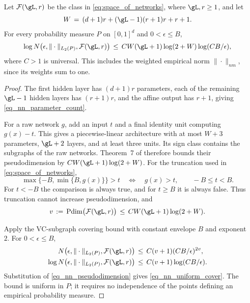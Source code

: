 \documentclass[twoside,11pt]{article}
\newenvironment{revision}{\color{revisionred}}{}
\begin{document}
\begin{revision}
\begin{lemma}
\label{nn_covering}
Let \(\mathcal F(\gL,r)\) be the class in
\eqref{eq:space_of_networks}, where \(\gL,r\geq1\), and let
\begin{equation}
\label{eq_nn_parameter_count}
W \,=\, (d+1)r+(\gL-1)(r+1)r+r+1.
\end{equation}
For every probability measure \(P\) on \([0,1]^d\) and
\(0<\epsilon\leq B\),
\begin{equation}
\label{eq_nn_uniform_cover}
\log N\bigl(\epsilon,\|\cdot\|_{L_2(P)},\mathcal F(\gL,r)\bigr)
\,\leq\,
C W(\gL+1)\log(2+W)\log(CB/\epsilon),
\end{equation}
where \(C>1\) is universal. This includes the weighted empirical
norm \(\|\cdot\|_{nm}\), since its weights sum to one.
\end{lemma}
\begin{proof}
The first hidden layer has \((d+1)r\) parameters, each of the
remaining \(\gL-1\) hidden layers has \((r+1)r\), and the
affine output has \(r+1\), giving \eqref{eq_nn_parameter_count}.

For a raw network \(g\), add an input \(t\) and a final identity
unit computing \(g(x)-t\). This gives a piecewise-linear
architecture with at most \(W+3\) parameters, \(\gL+2\) layers,
and at least three units. Its sign class contains the subgraphs
of the raw networks. Theorem~7 of \citet{bartlett2019nearly}
therefore bounds their pseudodimension by
\(CW(\gL+1)\log(2+W)\).
For the truncation used in \eqref{eq:space_of_networks},
\[
\max\{-B,\min\{B,g(x)\}\}>t
\quad\Longleftrightarrow\quad
g(x)>t,\qquad -B\leq t<B.
\]
For \(t<-B\) the comparison is always true, and for \(t\geq B\)
it is always false. Thus truncation cannot increase
pseudodimension, and
\begin{equation}
\label{eq_nn_pseudodimension}
v \,:=\, \operatorname{Pdim}\bigl(\mathcal F(\gL,r)\bigr)
\,\leq\, C W(\gL+1)\log(2+W).
\end{equation}

Apply the VC-subgraph covering bound
\citep[Theorem~8.2, p.~61]{wellner2004empirical} with constant
envelope \(B\) and exponent \(2\). For \(0<\epsilon\leq B\),
\[
\begin{aligned}
N\bigl(\epsilon,\|\cdot\|_{L_2(P)},\mathcal F(\gL,r)\bigr)
&\,\leq\, C(v+1)(CB/\epsilon)^{2v},\\
\log N\bigl(\epsilon,\|\cdot\|_{L_2(P)},\mathcal F(\gL,r)\bigr)
&\,\leq\, C(v+1)\log(CB/\epsilon).
\end{aligned}
\]
Substitution of \eqref{eq_nn_pseudodimension} gives
\eqref{eq_nn_uniform_cover}. The bound is uniform in \(P\);
it requires no independence of the points defining an empirical
probability measure.
\end{proof}
\end{revision}
\end{document}
